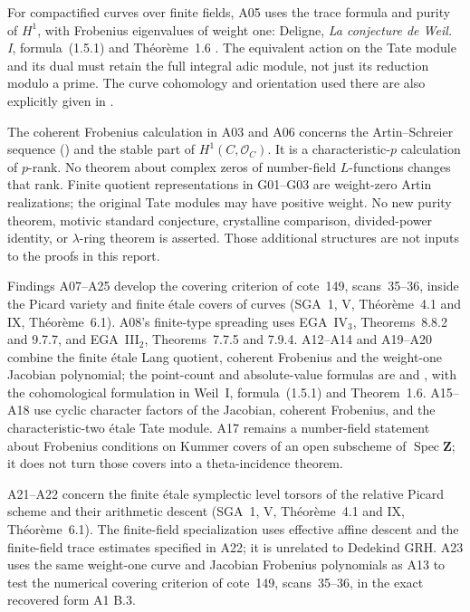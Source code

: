 \documentclass[11pt,a4paper]{article}
\begin{document}
For compactified curves over finite fields, A05 uses the trace
formula and purity of $H^1$, with Frobenius eigenvalues of weight one:
Deligne, \emph{La conjecture de Weil. I}, formula~(1.5.1) and
Th\'eor\`eme~1.6 \cite{WeilI}. The equivalent action on the
Tate module and its dual must retain the full integral adic module,
not just its reduction modulo a prime. The curve cohomology and
orientation used there are also explicitly given in
\cite[Proposition~14.2 and Remark~14.10]{MilneLEC}.

The coherent Frobenius calculation in A03 and A06 concerns the
Artin--Schreier sequence (\cite[Example~7.9(b)]{MilneLEC}) and the stable part of $H^1(C,\mathcal O_C)$.
It is a characteristic-$p$ calculation of $p$-rank. No theorem about
complex zeros of number-field $L$-functions changes that rank.
Finite quotient representations in G01--G03 are weight-zero Artin
realizations; the original Tate modules may have positive weight.
No new purity theorem, motivic standard conjecture, crystalline
comparison, divided-power identity, or $\lambda$-ring theorem is
asserted. Those additional structures are not inputs to the proofs
in this report.


Findings A07--A25 develop the covering criterion of cote~149,
scans~35--36, inside the Picard variety and finite \'etale covers of
curves (SGA~1, V, Th\'eor\`eme~4.1 and IX, Th\'eor\`eme~6.1).
A08's finite-type spreading uses EGA~IV$_3$, Theorems~8.8.2 and
9.7.7, and EGA~III$_2$, Theorems~7.7.5 and 7.9.4.
A12--A14 and A19--A20 combine the finite \'etale Lang quotient,
coherent Frobenius and the weight-one Jacobian polynomial; the
point-count and absolute-value formulas are
\cite[Theorem~19.1(a)--(c)]{MilneAV} and
\cite[Theorem~11.1]{MilneJV}, with the cohomological formulation
in Weil~I, formula~(1.5.1) and Theorem~1.6.
A15--A18 use cyclic character factors of the Jacobian, coherent
Frobenius, and the characteristic-two \'etale Tate module.
A17 remains a number-field statement about Frobenius conditions
on Kummer covers of an open subscheme of $\operatorname{Spec}\mathbf Z$;
it does not turn those covers into a theta-incidence theorem.

A21--A22 concern the finite \'etale symplectic level torsors of the
relative Picard scheme and their arithmetic descent (SGA~1, V,
Th\'eor\`eme~4.1 and IX, Th\'eor\`eme~6.1). The finite-field
specialization uses effective affine descent and the finite-field
trace estimates specified in A22; it is unrelated to Dedekind GRH.
A23 uses the same weight-one curve and Jacobian Frobenius polynomials
as A13 to test the numerical covering criterion of cote~149,
scans~35--36, in the exact recovered form A1 B.3.
\end{document}
